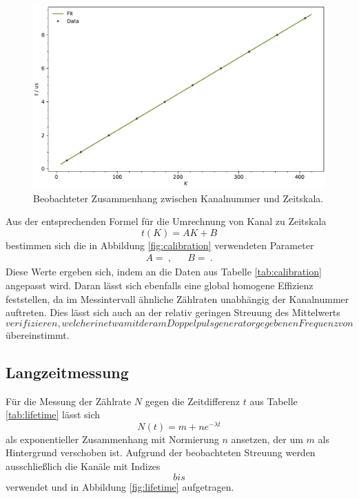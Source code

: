 \begin{figure}[H]
	\vspace{\baselineskip}
	\centering
	\includegraphics[width=\textwidth]{build/calibration.pdf}
	\caption{Beobachteter Zusammenhang zwischen Kanalnummer und Zeitskala.}
	\label{fig:calibration}
\end{figure}

Aus der entsprechenden Formel für die Umrechnung von Kanal zu Zeitskala
\begin{equation*}
	t(K) = AK + B
\end{equation*}
bestimmen sich die in Abbildung \eqref{fig:calibration} verwendeten Parameter
\begin{align*}
	A =  \: , && B =  \: .
\end{align*}
Diese Werte ergeben sich, indem an die Daten aus Tabelle \eqref{tab:calibration} angepasst wird. Daran lässt sich ebenfalls
eine global homogene Effizienz feststellen, da im Messintervall ähnliche Zählraten unabhängig der Kanalnummer auftreten.
Dies lässt sich auch an der relativ geringen Streuung des Mittelwerts $$ verifizieren, welcher in etwa mit
der am Doppelpulsgenerator gegebenen Frequenz von $$ übereinstimmt.



\subsection{Langzeitmessung}

Für die Messung der Zählrate $N$ gegen die Zeitdifferenz $t$ aus Tabelle \eqref{tab:lifetime} lässt sich
\begin{equation*}
	N(t) = m + ne^{-\lambda t}
\end{equation*}
als exponentieller Zusammenhang mit Normierung $n$ ansetzen, der um $m$ als Hintergrund verschoben ist. Aufgrund der
beobachteten Streuung werden ausschließlich die Kanäle mit Indizes $$ bis $$
verwendet und in Abbildung \eqref{fig:lifetime} aufgetragen.

